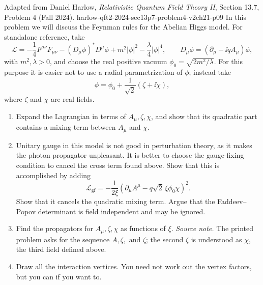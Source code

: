 \begin{enumerate}
  {Adapted from Daniel Harlow, \emph{Relativistic Quantum Field Theory II},
  Section 13.7, Problem 4 (Fall 2024).}
  {harlow-qft2-2024-sec13p7-problem4-v2ch21-p09}
  In this problem we will discuss the Feynman rules for the Abelian Higgs
  model.  For standalone reference, take
  \[
    \mathcal L=-\frac14F^{\mu\nu}F_{\mu\nu}
      -(D_\mu\phi)^*D^\mu\phi
      +m^2|\phi|^2-\frac{\lambda}{4}|\phi|^4,
    \qquad D_\mu\phi=(\partial_\mu-\ii qA_\mu)\phi ,
  \]
  with \(m^2,\lambda>0\), and choose the real positive vacuum
  \(\phi_0=\sqrt{2m^2/\lambda}\).  For this purpose it is easier not to
  use a radial parametrization of \(\phi\); instead take
  \[
    \phi=\phi_0+\frac1{\sqrt2}(\zeta+\ii\chi),
  \]
  where \(\zeta\) and \(\chi\) are real fields.
  \begin{enumerate}
    \item[(a)]
    Expand the Lagrangian in terms of \(A_\mu,\zeta,\chi\), and show that
    its quadratic part contains a mixing term between \(A_\mu\) and
    \(\chi\).
    \item[(b)]
    Unitary gauge in this model is not good in perturbation theory, as it
    makes the photon propagator unpleasant.  It is better to choose the
    gauge-fixing condition to cancel the cross term found above.  Show
    that this is accomplished by adding
    \[
      \mathcal L_{\mathrm{gf}}
        =-\frac1{2\xi}
          \left(\partial_\mu A^\mu-q\sqrt2\,\xi\phi_0\chi\right)^2 .
    \]
    Show that it cancels the quadratic mixing term.  Argue that the
    Faddeev--Popov determinant is field independent and may be ignored.
    \item[(c)]
    Find the propagators for \(A_\mu,\zeta,\chi\) as functions of \(\xi\).
    \emph{Source note.}  The printed problem asks for the sequence
    \(A,\zeta,\text{ and }\zeta\); the second \(\zeta\) is understood as
    \(\chi\), the third field defined above.
    \item[(d)]
    Draw all the interaction vertices.  You need not work out the vertex
    factors, but you can if you want to.
  \end{enumerate}


\end{enumerate}

